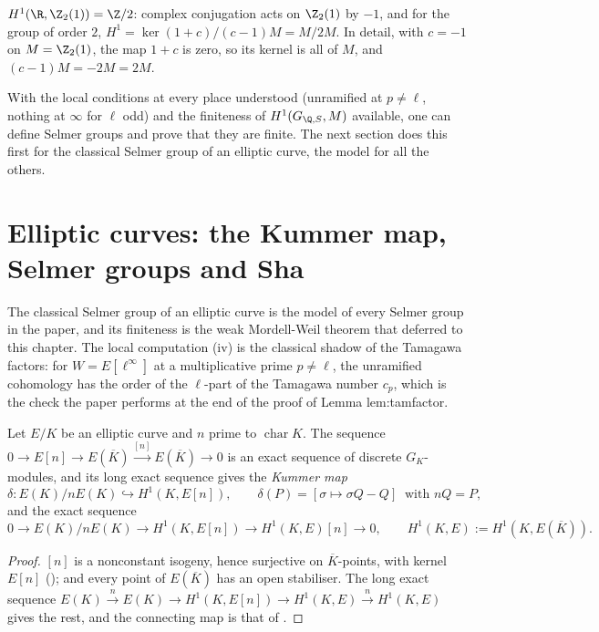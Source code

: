 \begin{example}\label{ex:galcoh:real-two}
$H^1(\R,\Z_2(1))=\Z/2$: complex conjugation acts on $\Z_2(1)$ by $-1$, and for the group of order $2$, $H^1=\ker(1+c)/(c-1)M=M/2M$. In detail, with $c=-1$ on
$M=\Z_2(1)$, the map $1+c$ is zero, so its kernel is all of $M$, and $(c-1)M=-2M=2M$.
\end{example}

With the local conditions at every place understood (unramified at $p\ne\ell$, nothing at $\infty$ for $\ell$ odd) and the finiteness of $H^1(G_{\Q,S},M)$ available, one
can define Selmer groups and prove that they are finite. The next section does this first for the classical Selmer group of an elliptic curve, the model for all the
others.

\section{Elliptic curves: the Kummer map, Selmer groups and Sha}\label{sec:galcoh:selmer-ec}

The classical Selmer group of an elliptic curve is the model of every Selmer group in the paper, and its finiteness is the weak Mordell-Weil theorem that
 deferred to this chapter. The local computation (iv) is the classical shadow of the Tamagawa factors:
for $W=E[\ell^\infty]$ at a multiplicative prime $p\ne\ell$, the unramified cohomology has the order of the $\ell$-part of the Tamagawa number $c_p$, which is the check
the paper performs at the end of the proof of Lemma lem:tamfactor.

\begin{proposition}\label{prop:galcoh:ec-kummer}
Let $E/K$ be an elliptic curve and $n$ prime to $\operatorname{char}K$. The sequence $0\to E[n]\to E(\overline K)\xrightarrow{[n]}E(\overline K)\to0$ is an exact sequence of
discrete $G_K$-modules, and its long exact sequence gives the \emph{Kummer map}
\[
\delta\colon E(K)/nE(K)\hookrightarrow H^1(K,E[n]),\qquad\delta(P)=[\sigma\mapsto\sigma Q-Q]\ \text{ with }nQ=P,
\]
and the exact sequence
\[
0\to E(K)/nE(K)\to H^1(K,E[n])\to H^1(K,E)[n]\to0,\qquad H^1(K,E):=H^1(K,E(\overline K)).
\]
\end{proposition}

\begin{proof}
$[n]$ is a nonconstant isogeny, hence surjective on $\overline K$-points, with kernel $E[n]$ (); and every point of $E(\overline K)$ has an open
stabiliser. The long exact sequence $E(K)\xrightarrow{n}E(K)\to H^1(K,E[n])\to H^1(K,E)\xrightarrow{n}H^1(K,E)$ gives the rest, and the connecting map is that of
.
\end{proof}

